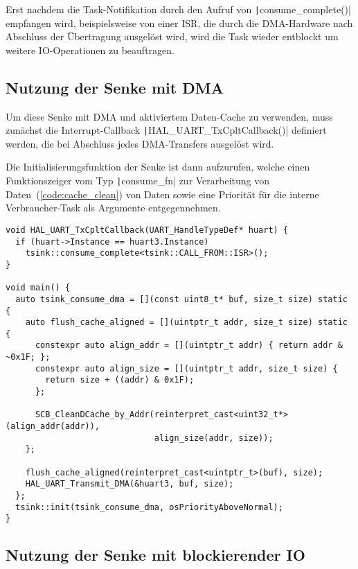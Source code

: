 Erst nachdem die Task-Notifikation durch den Aufruf von
\texttt|consume_complete()| empfangen wird, beispielsweise von einer
\ac{ISR}, die durch die DMA-Hardware nach Abschluss der Übertragung ausgelöst
wird, wird die Task wieder entblockt um weitere IO-Operationen zu beauftragen.

\subsection{Nutzung der Senke mit DMA}

Um diese Senke mit DMA und aktiviertem Daten-Cache zu verwenden, muss zunächst
die Interrupt-Callback \texttt|HAL_UART_TxCpltCallback()| definiert
werden, die bei Abschluss jedes DMA-Transfers ausgelöst wird.

Die Initialisierungsfunktion der Senke ist dann aufzurufen, welche einen
Funktionszeiger vom Typ \texttt|consume_fn| zur Verarbeitung von
Daten~(\ref{code:cache_clean}) von Daten sowie eine Priorität für die interne
Verbraucher-Task als Argumente entgegennehmen.

\begin{code}
\begin{verbatim}
void HAL_UART_TxCpltCallback(UART_HandleTypeDef* huart) {
  if (huart->Instance == huart3.Instance)
    tsink::consume_complete<tsink::CALL_FROM::ISR>();
}

void main() {
  auto tsink_consume_dma = [](const uint8_t* buf, size_t size) static {
    auto flush_cache_aligned = [](uintptr_t addr, size_t size) static {
      constexpr auto align_addr = [](uintptr_t addr) { return addr & ~0x1F; };
      constexpr auto align_size = [](uintptr_t addr, size_t size) {
        return size + ((addr) & 0x1F);
      };

      SCB_CleanDCache_by_Addr(reinterpret_cast<uint32_t*>(align_addr(addr)),
                              align_size(addr, size));
    };

    flush_cache_aligned(reinterpret_cast<uintptr_t>(buf), size);
    HAL_UART_Transmit_DMA(&huart3, buf, size);
  };
  tsink::init(tsink_consume_dma, osPriorityAboveNormal);
}
\end{verbatim}
\end{code}

\subsection{Nutzung der Senke mit blockierender IO}

